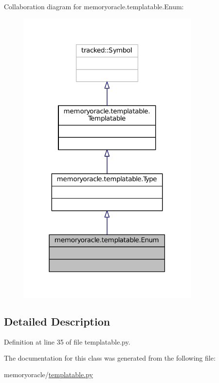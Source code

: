 Collaboration diagram for memoryoracle.\+templatable.\+Enum\+:\nopagebreak
\begin{figure}[H]
\begin{center}
\leavevmode
\includegraphics[width=258pt]{classmemoryoracle_1_1templatable_1_1Enum__coll__graph}
\end{center}
\end{figure}


\subsection{Detailed Description}


Definition at line 35 of file templatable.\+py.



The documentation for this class was generated from the following file\+:\begin{DoxyCompactItemize}
\item 
memoryoracle/\hyperlink{templatable_8py}{templatable.\+py}\end{DoxyCompactItemize}
